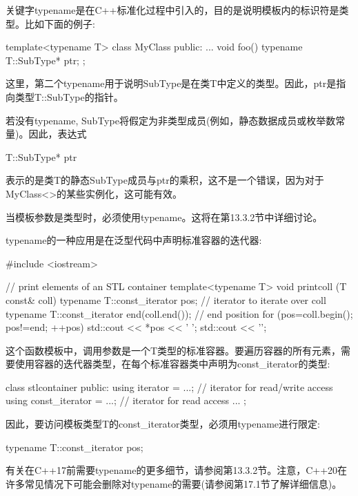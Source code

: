 关键字typename是在C++标准化过程中引入的，目的是说明模板内的标识符是类型。比如下面的例子:

\begin{cpp}
template<typename T>
class MyClass {
	public:
	...
	void foo() {
		typename T::SubType* ptr;
	}
};
\end{cpp}

这里，第二个typename用于说明SubType是在类T中定义的类型。因此，ptr是指向类型T::SubType的指针。

若没有typename, SubType将假定为非类型成员(例如，静态数据成员或枚举数常量)。因此，表达式

\begin{cpp}
T::SubType* ptr
\end{cpp}

表示的是类T的静态SubType成员与ptr的乘积，这不是一个错误，因为对于MyClass<>的某些实例化，这可能有效。

当模板参数是类型时，必须使用typename。这将在第13.3.2节中详细讨论。

typename的一种应用是在泛型代码中声明标准容器的迭代器:

\begin{cpp}
#include <iostream>

// print elements of an STL container
template<typename T>
void printcoll (T const& coll)
{
	typename T::const_iterator pos; // iterator to iterate over coll
	typename T::const_iterator end(coll.end()); // end position
	for (pos=coll.begin(); pos!=end; ++pos) {
		std::cout << *pos << ' ';
	}
	std::cout << '\n';
}
\end{cpp}

这个函数模板中，调用参数是一个T类型的标准容器。要遍历容器的所有元素，需要使用容器的迭代器类型，在每个标准容器类中声明为const\_iterator的类型:

\begin{cpp}
class stlcontainer {
	public:
	using iterator = ...; // iterator for read/write access
	using const_iterator = ...; // iterator for read access
	...
};
\end{cpp}

因此，要访问模板类型T的const\_iterator类型，必须用typename进行限定:

\begin{cpp}
typename T::const_iterator pos;
\end{cpp}

有关在C++17前需要typename的更多细节，请参阅第13.3.2节。注意，C++20在许多常见情况下可能会删除对typename的需要(请参阅第17.1节了解详细信息)。












